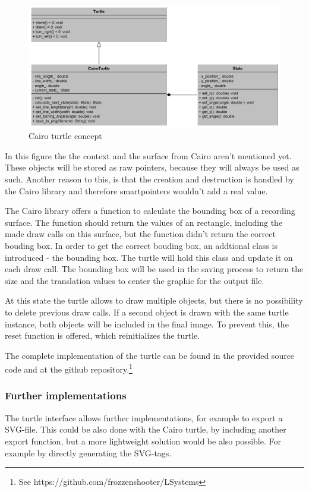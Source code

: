 \documentclass[english]{cpp-hmwk}
\begin{document}
\begin{figure}[h!]
	\centering
	\includegraphics[width=1\columnwidth]{../graphs/class_cairo_turtle.png}
	\caption{Cairo turtle concept}
	\label{figure:cairoturtle}
\end{figure}

\noindent In this figure the the context and the surface from Cairo aren't mentioned yet. These objects will be stored as raw pointers, because they will always be used as such. Another reason to this, is that the creation and destruction is handled by the Cairo library and therefore smartpointers wouldn't add a real value.\newline

\noindent The Cairo library offers a function to calculate the bounding box of a recording surface. The function should return the values of an rectangle, including the made draw calls on this surface, but the function didn't return the correct bouding box. In order to get the correct bouding box, an addtional class is introduced - the bounding box. The turtle will hold this class and update it on each draw call. The bounding box will be used in the saving process to return the size and the translation values to center the graphic for the output file.

\noindent At this state the turtle allows to draw multiple objects, but there is no possibility to delete previous draw calls. If a second object is drawn with the same turtle instance, both objects will be included in the final image. To prevent this, the reset function is offered, which reinitializes the turtle.

The complete implementation of the turtle can be found in the provided source code and at the github repository.\footnote{See https://github.com/frozzenshooter/LSystems}

\subsubsection{Further implementations}
The turtle interface allows further implementations, for example to export a SVG-file. This could be also done with the Cairo turtle, by including another export function, but a more lightweight solution would be also possible. For example by directly generating the SVG-tags. 
\end{document}
